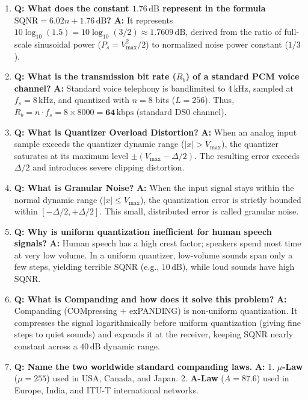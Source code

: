 \documentclass[11pt,a4paper]{article}
\begin{document}
\begin{enumerate}
    \item \textbf{Q: What does the constant $1.76\,\mathrm{dB}$ represent in the formula $\mathrm{SQNR} = 6.02 n + 1.76\,\mathrm{dB}$?}  
    \textbf{A:} It represents $10 \log_{10}(1.5) = 10 \log_{10}(3/2) \approx 1.7609\,\mathrm{dB}$, derived from the ratio of full-scale sinusoidal power ($P_s = V_{\max}^2/2$) to normalized noise power constant ($1/3$).

    \item \textbf{Q: What is the transmission bit rate ($R_b$) of a standard PCM voice channel?}  
    \textbf{A:} Standard voice telephony is bandlimited to $4\,\mathrm{kHz}$, sampled at $f_s = 8\,\mathrm{kHz}$, and quantized with $n = 8$ bits ($L = 256$). Thus, $R_b = n \cdot f_s = 8 \times 8000 = \mathbf{64\,\mathrm{kbps}}$ (standard DS0 channel).

    \item \textbf{Q: What is Quantizer Overload Distortion?}  
    \textbf{A:} When an analog input sample exceeds the quantizer dynamic range ($|x| > V_{\max}$), the quantizer saturates at its maximum level $\pm(V_{\max} - \Delta/2)$. The resulting error exceeds $\Delta/2$ and introduces severe clipping distortion.

    \item \textbf{Q: What is Granular Noise?}  
    \textbf{A:} When the input signal stays within the normal dynamic range ($|x| \le V_{\max}$), the quantization error is strictly bounded within $[-\Delta/2, +\Delta/2]$. This small, distributed error is called granular noise.

    \item \textbf{Q: Why is uniform quantization inefficient for human speech signals?}  
    \textbf{A:} Human speech has a high crest factor; speakers spend most time at very low volume. In a uniform quantizer, low-volume sounds span only a few steps, yielding terrible SQNR (e.g., $10\,\mathrm{dB}$), while loud sounds have high SQNR.

    \item \textbf{Q: What is Companding and how does it solve this problem?}  
    \textbf{A:} Companding (COMpressing + exPANDING) is non-uniform quantization. It compresses the signal logarithmically before uniform quantization (giving fine steps to quiet sounds) and expands it at the receiver, keeping SQNR nearly constant across a $40\,\mathrm{dB}$ dynamic range.

    \item \textbf{Q: Name the two worldwide standard companding laws.}  
    \textbf{A:} 1. \textbf{$\mu$-Law} ($\mu = 255$) used in USA, Canada, and Japan. 2. \textbf{A-Law} ($A = 87.6$) used in Europe, India, and ITU-T international networks.


\end{enumerate}
\end{document}
